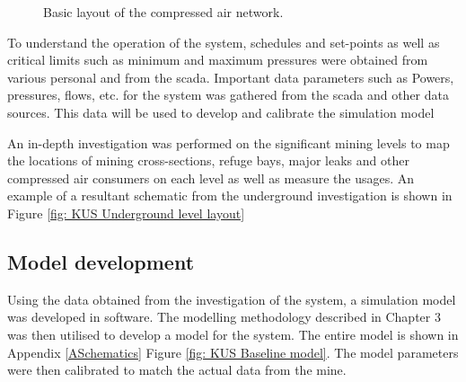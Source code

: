 	\begin{figure}[h!]
		\centering
		\caption{Basic layout of the compressed air network.}
		\label{fig: KUS Air layout}
	\end{figure}
 To understand the operation of the system, schedules and set-points as well as critical limits such as minimum and maximum pressures were obtained from various personal and from the \gls{scada}. Important data parameters such as Powers, pressures, flows, etc. for the system was gathered from the \gls{scada} and other data sources. This data will be used to develop and calibrate the simulation model
\par 
		
	An in-depth investigation was performed on the significant mining levels to map the locations of mining cross-sections, refuge bays, major leaks and other compressed air consumers on each level as well as measure the usages. An example of a resultant schematic from the underground investigation is shown in Figure \ref{fig: KUS Underground level layout}
	
	\subsection{Model development}
	
	Using the data obtained from the investigation of the system, a  simulation model was developed in software. The modelling methodology described in Chapter 3 was then utilised to develop a model for the system. The entire model is shown in Appendix \ref{ASchematics} Figure \ref{fig: KUS Baseline model}. The model parameters were then calibrated to match the actual data from the mine.
	
